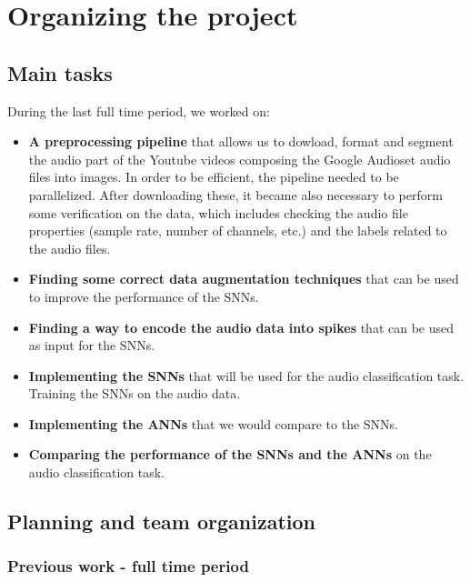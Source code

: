 \documentclass[11pt]{article}
\begin{document}
\pagebreak

\section{Organizing the project}

\subsection{Main tasks}

During the last full time period, we worked on:

\begin{itemize}
  \item \textbf{A preprocessing pipeline} that allows us to dowload, format and segment the audio part of the Youtube videos composing the Google Audioset audio files into images.
        In order to be efficient, the pipeline needed to be parallelized.
        \subitem After downloading these, it became also necessary to perform some verification on the data, which includes checking the audio file properties (sample rate, number of channels, etc.) and the labels related to the audio files.
  \item \textbf{Finding some correct data augmentation techniques} that can be used to improve the performance of the SNNs.
  \item \textbf{Finding a way to encode the audio data into spikes} that can be used as input for the SNNs.
\end{itemize}

\begin{itemize}
  \item \textbf{Implementing the SNNs} that will be used for the audio classification task.
        \subitem Training the SNNs on the audio data.
  \item \textbf{Implementing the ANNs} that we would compare to the SNNs.
  \item \textbf{Comparing the performance of the SNNs and the ANNs} on the audio classification task.
\end{itemize}


\subsection{Planning and team organization}

\subsubsection{Previous work - full time period}
\end{document}
